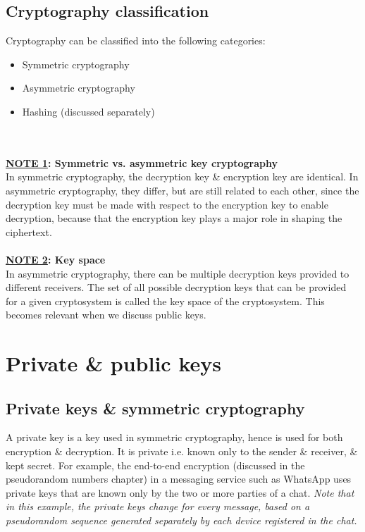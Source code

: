 \subsection{Cryptography classification}
Cryptography can be classified into the following categories:
\begin{itemize}
	\item Symmetric cryptography
	\item Asymmetric cryptography
	\item Hashing (discussed separately)
\end{itemize}
\\~\\
\textbf{\underline{NOTE 1}: Symmetric vs. asymmetric key cryptography}\\
In symmetric cryptography, the decryption key \& encryption key are identical. In asymmetric cryptography, they differ, but are still related to each other, since the decryption key must be made with respect to the encryption key to enable decryption, because that the encryption key plays a major role in shaping the ciphertext.
\\~\\
\textbf{\underline{NOTE 2}: Key space}\\
In asymmetric cryptography, there can be multiple decryption keys provided to different receivers. The set of all possible decryption keys that can be provided for a given cryptosystem is called the key space of the cryptosystem. This becomes relevant when we discuss public keys.

\section{Private \& public keys}
\subsection{Private keys \& symmetric cryptography}
A private key is a key used in symmetric cryptography, hence is used for both encryption \& decryption. It is private i.e. known only to the sender \& receiver, \& kept secret. For example, the end-to-end encryption (discussed in the pseudorandom numbers chapter) in a messaging service such as WhatsApp uses private keys that are known only by the two or more parties of a chat. \textit{Note that in this example, the private keys change for every message, based on a pseudorandom sequence generated separately by each device registered in the chat.}

